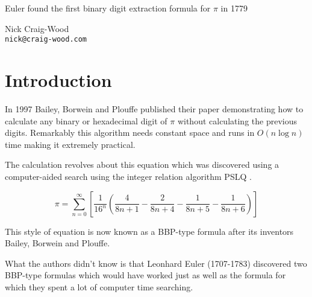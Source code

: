 \documentclass[11pt]{article}
\begin{document}

\begin{center}
{\LARGE Euler found the first binary digit extraction formula for $\pi$ in 1779} \\

\bigskip\bigskip

{Nick Craig-Wood \\ {\tt nick@craig-wood.com}}

\end{center}

\medskip

\begin{abstract}\noindent
In 1779 Euler discovered two formulas for $\pi$ which can be used to calculate any binary digit of $\pi$ without calculating the previous digits. Up until now it was believed that the first formula with the correct properties (known as a BBP-type formula) for this calculation was published by Bailey, Borwein and Plouffe in 1997.
\end{abstract}

\medskip


\section{Introduction}

In 1997 Bailey, Borwein and Plouffe published their paper \cite{BBP} demonstrating how to calculate any binary or hexadecimal digit of $\pi$ without calculating the previous digits. Remarkably this algorithm needs constant space and runs in $O(n \log{n})$ time making it extremely practical.

The calculation revolves about this equation which was discovered using a computer-aided search using the integer relation algorithm PSLQ \cite{PSLQ}.

\begin{equation}   \label{eq:originalbbp}
  \pi = \sum_{n = 0}^\infty \left[ \frac{1}{16^n} \left( \frac{4}{8n + 1} - \frac{2}{8n + 4} - \frac{1}{8n + 5} - \frac{1}{8n + 6} \right) \right]
\end{equation}

This style of equation is now known as a BBP-type formula after its inventors Bailey, Borwein and Plouffe.

What the authors didn't know is that Leonhard Euler (1707-1783) discovered two BBP-type formulas which would have worked just as well as the formula for which they spent a lot of computer time searching.
\end{document}
